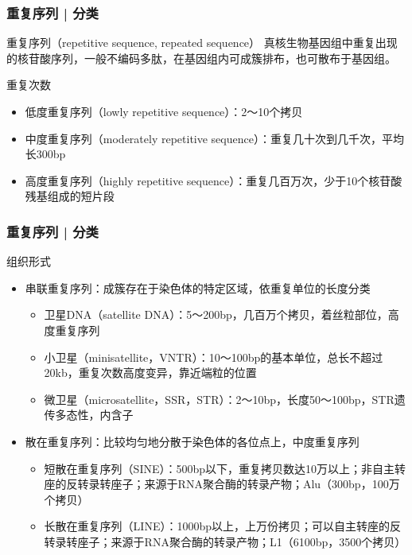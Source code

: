 \begin{frame}
  \frametitle{重复序列 | \alert{分类}}
  \begin{block}{重复序列（repetitive sequence, repeated sequence）}
    真核生物基因组中重复出现的核苷酸序列，一般不编码多肽，在基因组内可成簇排布，也可散布于基因组。
  \end{block}
  \pause
  \begin{block}{重复次数}
    \begin{itemize}
      \item 低度重复序列（lowly repetitive sequence）：2～10个拷贝
      \item 中度重复序列（moderately repetitive sequence）：重复几十次到几千次，平均长300bp
      \item 高度重复序列（highly repetitive sequence）：重复几百万次，少于10个核苷酸残基组成的短片段
    \end{itemize}
  \end{block}
\end{frame}

\begin{frame}
  \frametitle{重复序列 | \alert{分类}}
  \begin{block}{组织形式}
    \begin{itemize}
      \item 串联重复序列：成簇存在于染色体的特定区域，依重复单位的长度分类
        \begin{itemize}
          \item 卫星DNA（satellite DNA）：5～200bp，几百万个拷贝，着丝粒部位，高度重复序列
          \item 小卫星（minisatellite，VNTR）：10～100bp的基本单位，总长不超过20kb，重复次数高度变异，靠近端粒的位置
          \item 微卫星（microsatellite，SSR，STR）：2～10bp，长度50～100bp，STR遗传多态性，内含子
        \end{itemize}
      \item 散在重复序列：比较均匀地分散于染色体的各位点上，中度重复序列
        \begin{itemize}
          \item 短散在重复序列（SINE）：500bp以下，重复拷贝数达10万以上；非自主转座的反转录转座子；来源于RNA聚合酶的转录产物；Alu（300bp，100万个拷贝）
          \item 长散在重复序列（LINE）：1000bp以上，上万份拷贝；可以自主转座的反转录转座子；来源于RNA聚合酶的转录产物；L1（6100bp，3500个拷贝）
        \end{itemize}
    \end{itemize}
  \end{block}
\end{frame}

